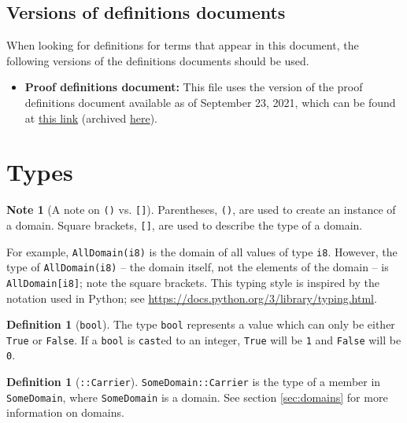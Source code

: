 \documentclass[11pt,a4paper]{article}
\theoremstyle{definition}
\newtheorem{definition}[theorem]{Definition}
\newtheorem{note}[theorem]{Note}
\begin{document}
\subsection{Versions of definitions documents}
\label{sec:versioned-docs}

When looking for definitions for terms that appear in this document, the following versions of the definitions documents should be used.

\begin{itemize}
    \item \textbf{Proof definitions document:} This file uses the version of the proof definitions document available as of September 23, 2021, which can be found at \href{https://github.com/opendp/whitepapers/blob/proof-defns/proof-defns/proof_defns.pdf}{this link} (archived \href{https://github.com/opendp/whitepapers/blob/f43bf7056a5fd3b6f7b4bb77d451eafa042fe8f7/proof-defns/proof_defns.pdf}{here}). 
\end{itemize}

\section{Types}

\begin{note}[A note on \texttt{()} vs. \texttt{[]}] Parentheses, \texttt{()}, are used to create an instance of a domain. Square brackets, \texttt{[]}, are used to describe the type of a domain.

For example, \texttt{AllDomain(i8)} is the domain of all values of type \texttt{i8}. However, the type of \texttt{AllDomain(i8)} -- the domain itself, not the elements of the domain -- is \texttt{AllDomain[i8]}; note the square brackets. This typing style is inspired by the notation used in Python; see \url{https://docs.python.org/3/library/typing.html}.
\end{note}

\begin{definition}[\texttt{bool}]
    The type \texttt{bool} represents a value which can only be either \texttt{True} or \texttt{False}. If a \texttt{bool} is \texttt{cast}ed to an integer, \texttt{True} will be \texttt{1} and \texttt{False} will be \texttt{0}.
\end{definition}

\begin{definition}[\texttt{::Carrier}]
\texttt{SomeDomain::Carrier} is the type of a member in \texttt{SomeDomain}, where \texttt{SomeDomain} is a domain. See section \ref{sec:domains} for more information on domains. 
\end{definition}
\end{document}
